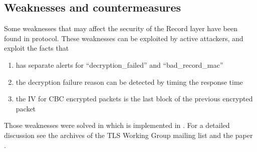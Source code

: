 \subsection*{Weaknesses and countermeasures}

Some weaknesses that may affect the security of the Record layer have been
found in \tlsI{} protocol. These weaknesses can be exploited by active attackers,
and exploit the facts that
\begin{enumerate}
\item \tls{} has separate alerts for ``decryption\_failed'' and ``bad\_record\_mac''
\item the decryption failure reason can be detected by timing the response time
\item the IV for CBC encrypted packets is the last block of the previous encrypted packet
\end{enumerate}

Those weaknesses were solved in \tlsII{} which is implemented in
\gnutls{}. For a detailed discussion see the archives of the TLS Working Group mailing list
and the paper \cite{CBCATT}.


